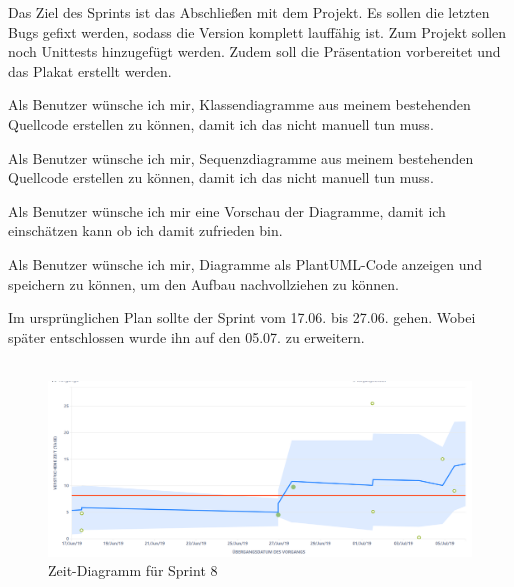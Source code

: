 
Das Ziel des Sprints ist das Abschließen mit dem Projekt. Es sollen die letzten Bugs gefixt werden, sodass die Version komplett lauffähig ist. Zum Projekt sollen noch Unittests hinzugefügt werden. Zudem soll die Präsentation vorbereitet und das Plakat erstellt werden.

\nsecend


Als Benutzer wünsche ich mir, Klassendiagramme aus meinem bestehenden Quellcode erstellen zu können, damit ich das nicht manuell tun muss.
\nsecend

Als Benutzer wünsche ich mir, Sequenzdiagramme aus meinem bestehenden Quellcode erstellen zu können, damit ich das nicht manuell tun muss.
\nsecend

Als Benutzer wünsche ich mir eine Vorschau der Diagramme, damit ich einschätzen kann ob ich
damit zufrieden bin.
\nsecend

Als Benutzer wünsche ich mir, Diagramme als PlantUML-Code anzeigen und speichern zu können, um den Aufbau nachvollziehen zu können.
\nsecend

\nsecend %


Im ursprünglichen Plan sollte der Sprint vom 17.06. bis 27.06. gehen. Wobei später entschlossen wurde ihn auf den 05.07. zu erweitern. \\\\

\begin{figure}[hbtp]
	\centering
	\includegraphics[width=\textwidth]{Bilder/ZeitSprint8}
	\caption{Zeit-Diagramm für Sprint 8}
\end{figure}

\nsecend%

